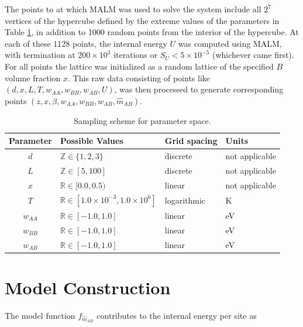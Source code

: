 \documentclass[10pt]{article}
\begin{document}
The points to at which MALM was used to solve the system include all $2^7$ vertices of the hypercube defined by the extreme values of the parameters in Table \ref{tbl:param_ranges}, in addition to 1000 random points from the interior of the hypercube.
At each of these 1128 points, the internal energy $U$ was computed using MALM, with termination at $200 \times 10^3$ iterations or $S_{U} < 5 \times 10^{-5}$ (whichever came first).
For all points the lattice was initialized as a random lattice of the specified $B$ volume fraction $x$.
This raw data consisting of points like $(d,x,L,T,w_{AA},w_{BB},w_{AB},U)$, was then processed to generate corresponding points $(z,x,\beta,w_{AA},w_{BB},w_{AB},\hat{m}_{AB})$.

\begin{table}[h!]
    \caption{Sampling scheme for parameter space.}
    \begin{center}
    \begin{tabular}{c | l | l | l} 
        \hline
        \textbf{Parameter} & \textbf{Possible Values} & \textbf{Grid spacing} & \textbf{Units} \\  \hline
        $d$ & $\mathbb{Z} \in \{1,2,3\}$ & discrete & not applicable \\ \hline
        $L$ & $\mathbb{Z} \in [5,100]$ & discrete & not applicable \\ \hline
        $x$ & $\mathbb{R} \in [0.0,0.5)$ & linear & not applicable \\ \hline
        $T$ & $\mathbb{R} \in [1.0 \times 10^{-3},1.0 \times 10^6]$ & logarithmic & K \\ \hline
        $w_{AA}$ & $\mathbb{R} \in [-1.0, 1.0]$ & linear & eV \\ \hline
        $w_{BB}$ & $\mathbb{R} \in [-1.0, 1.0]$ & linear & eV \\ \hline
        $w_{AB}$ & $\mathbb{R} \in [-1.0, 1.0]$ & linear & eV
        \label{tbl:param_ranges}
    \end{tabular}
    \end{center}
\end{table}


\section{Model Construction}
The model function $f_{\hat{m}_{AB}}$ contributes to the internal energy per site as
\end{document}
